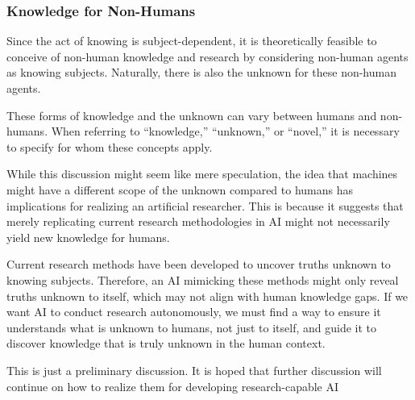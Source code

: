 \subsubsection{Knowledge for Non-Humans}

Since the act of knowing is subject-dependent, it is theoretically feasible to conceive of non-human knowledge and research by considering non-human agents as knowing subjects. Naturally, there is also the unknown for these non-human agents.

These forms of knowledge and the unknown can vary between humans and non-humans. When referring to ``knowledge,'' ``unknown,'' or ``novel,'' it is necessary to specify for whom these concepts apply.

While this discussion might seem like mere speculation, the idea that machines might have a different scope of the unknown compared to humans has implications for realizing an artificial researcher. This is because it suggests that merely replicating current research methodologies in AI might not necessarily yield new knowledge for humans.

Current research methods have been developed to uncover truths unknown to knowing subjects. Therefore, an AI mimicking these methods might only reveal truths unknown to itself, which may not align with human knowledge gaps. If we want AI to conduct research autonomously, we must find a way to ensure it understands what is unknown to humans, not just to itself, and guide it to discover knowledge that is truly unknown in the human context.

This is just a preliminary discussion. It is hoped that further discussion will continue on how to realize them for developing research-capable AI







